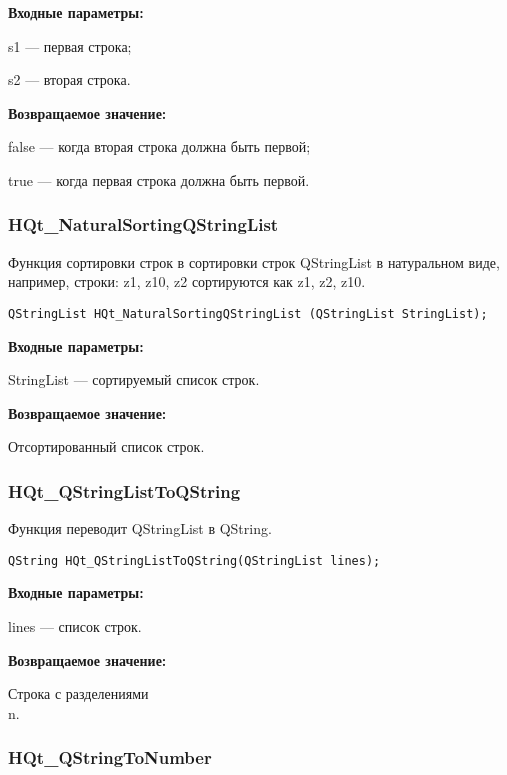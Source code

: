 \documentclass[a4paper,12pt]{article}
\begin{document}
\textbf{Входные параметры:}

     s1 --- первая строка;
	 
     s2 --- вторая строка.

\textbf{Возвращаемое значение:}
 
false --- когда вторая строка должна быть первой;

true --- когда первая строка должна быть первой.


\subsubsection{HQt\_NaturalSortingQStringList}\label{HQt_NaturalSortingQStringList}

Функция сортировки строк в сортировки строк QStringList в натуральном виде, например, строки: z1, z10, z2 сортируются как z1, z2, z10.


\begin{lstlisting}[label=code_syntax_HQt_NaturalSortingQStringList,caption=Синтаксис]
QStringList HQt_NaturalSortingQStringList (QStringList StringList);
\end{lstlisting}

\textbf{Входные параметры:}

StringList --- сортируемый список строк.

\textbf{Возвращаемое значение:}
 
Отсортированный список строк.


\subsubsection{HQt\_QStringListToQString}\label{HQt_QStringListToQString}

Функция переводит QStringList в QString.


\begin{lstlisting}[label=code_syntax_HQt_QStringListToQString,caption=Синтаксис]
QString HQt_QStringListToQString(QStringList lines);
\end{lstlisting}

\textbf{Входные параметры:}
 
lines --- список строк.

\textbf{Возвращаемое значение:}

Строка с разделениями \\n.


\subsubsection{HQt\_QStringToNumber}\label{HQt_QStringToNumber}
\end{document}
